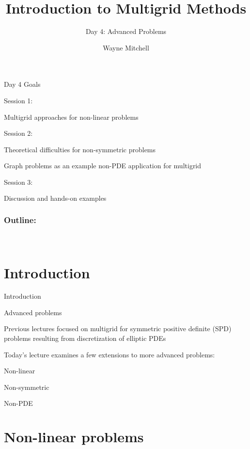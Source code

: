 \documentclass[18pt,xcolor=table]{beamer}
\title[Multigrid]{Introduction to Multigrid Methods}
\subtitle{Day 4: Advanced Problems}
\author[Mitchell]{Wayne Mitchell}
\institute{\pgfuseimage{logo}\\Universit\"at Heidelberg\\Institut f\"ur Technische Informatik}
\date[]{\alert{}}
\begin{document}


\DeclareRobustCommand{\Chi}{\raisebox{2pt}{$\chi$}}

\begin{frame}{}
\begin{block}{Day 4 Goals}
\bit
\item Session 1:
\bit
\item Multigrid approaches for non-linear problems
\eit
\item Session 2:
\bit
\item Theoretical difficulties for non-symmetric problems
\item Graph problems as an example non-PDE application for multigrid
\eit
\item Session 3:
\bit
\item Discussion and hands-on examples
\eit
\eit
\end{block}
\end{frame}

\begin{frame}
\frametitle{\bf Outline:}
\framesubtitle{~~}
\tableofcontents
\end{frame}


\section{Introduction}

\begin{frame}{Introduction}
\begin{block}{Advanced problems}
\bit
\item Previous lectures focused on multigrid for symmetric positive definite (SPD) problems resulting from discretization of elliptic PDEs
\item Today's lecture examines a few extensions to more advanced problems:
\bit
\item Non-linear
\item Non-symmetric
\item Non-PDE
\eit
\eit
\end{block}
\end{frame}


\section{Non-linear problems}
\end{document}
